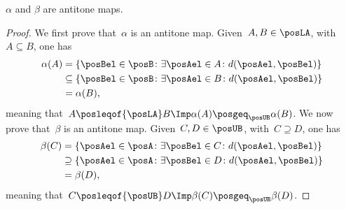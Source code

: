 \begin{lemma}
	\label{lem:alfabetaantitone}
	$\alpha$ and $\beta$ are antitone maps.
\end{lemma}
\begin{proof}
	We first prove that~$\alpha$ is an antitone map.
	Given~$A,B\in \posLA$, with~$A\subseteq B$, one has
	\begin{equation}
		\begin{aligned}
			\alpha(A) & =\{ \posBel\in \posB \colon \exists \posAel\in A\colon d(\posAel,\posBel)\}         \\
			          & \subseteq \{\posBel\in \posB \colon \exists \posAel\in B\colon d(\posAel,\posBel)\} \\
			          & =\alpha(B),
		\end{aligned}
	\end{equation}
	meaning that~$A\posleqof{\posLA} B\Imp \alpha(A) \posgeq_{\posUB} \alpha(B)$.
	We now prove that~$\beta$ is an antitone map.
	Given~$C,D\in \posUB$, with~$C\supseteq D$, one has
	\begin{equation}
		\begin{aligned}
			\beta(C) & =\{\posAel\in \posA\colon \exists \posBel\in C\colon d(\posAel,\posBel)\}           \\
			         & \supseteq \{\posAel\in \posA\colon \exists \posBel\in D \colon d(\posAel,\posBel)\} \\
			         & =\beta(D),
		\end{aligned}
	\end{equation}
	meaning that~$C\posleqof{\posUB} D \Imp \beta(C)\posgeq_{\posUB} \beta(D)$.
\end{proof}


